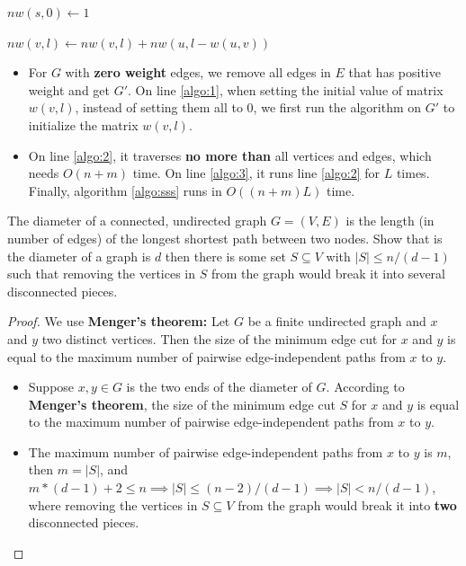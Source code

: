 \documentclass{article}
\newcounter{exercise}
\newcommand{\<}{
    \langle}
\renewcommand{\>}{
    \rangle}
\begin{document}
{\begin{algorithm}[htb]
\begin{algorithmic}[1]
        \State
        \State $nw(s,0)\leftarrow 1$
        
        

        \label{algo:3}
        
            \label{algo:2}
                    \State $nw(v,l)\leftarrow nw(v,l)+nw(u,l-w(u,v))$ 
                \EndFor
            \EndFor
        \EndFor
    \end{algorithmic}
\end{algorithm}

\begin{itemize}
    \item For $G$ with \textbf{zero weight} edges, we remove all edges in $E$ that has positive weight and get $G'$. On line \ref{algo:1}, when setting the initial value of matrix $w(v,l)$, instead of setting them all to $0$, we first run the algorithm on $G'$ to initialize the matrix $w(v,l)$.
    \item On line \ref{algo:2}, it traverses \textbf{no more than} all vertices and edges, which needs $O(n+m)$ time. On line \ref{algo:3}, it runs line \ref{algo:2} for $L$ times. Finally, algorithm \ref{algo:sss} runs in $O((n+m)L)$ time.
\end{itemize}



\begin{exercise}
The diameter of a connected, undirected graph $G=(V,E)$ is the length (in number of edges) of the longest shortest path between two nodes. Show that is the diameter of a graph is $d$ then there is some set $S\subseteq V$ with $|S|\leq n/(d-1)$ such that removing the vertices in $S$ from the graph would break it into several disconnected pieces.

\end{exercise}
\begin{proof} 
    \leavevmode\newline

We use \textbf{Menger's theorem:} Let $G$ be a finite undirected graph and $x$ and $y$ two distinct vertices. Then the size of the minimum edge cut for $x$ and $y$ is equal to the maximum number of pairwise edge-independent paths from $x$ to $y$.
\begin{itemize}
    \item Suppose $x,y\in G$ is the two ends of the diameter of $G$. According to \textbf{Menger's theorem}, the size of the minimum edge cut $S$ for $x$ and $y$ is equal to the maximum number of pairwise edge-independent paths from $x$ to $y$.
    \item The maximum number of pairwise edge-independent paths from $x$ to $y$ is $m$, then $m=|S|$, and $m*(d-1)+2\leq n\implies |S|\leq (n-2)/(d-1) \implies |S| < n/(d-1)$, where removing the vertices in $S\subseteq V$ from the graph would break it into \textbf{two} disconnected pieces.
\end{itemize}


\end{proof}}
\end{document}
